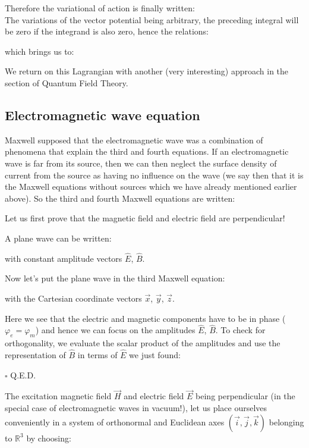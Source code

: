 	Therefore the variational of action is finally written:
	\\
	The variations of the vector potential being arbitrary, the preceding integral will be zero if the integrand is also zero, hence the relations:
	
	which brings us to:
	
	\begin{tcolorbox}[title=Remark,colframe=black,arc=10pt]
	We return on this Lagrangian with another (very interesting) approach in the section of Quantum Field Theory.
	\end{tcolorbox}
	
	\pagebreak
	\subsection{Electromagnetic wave equation}\label{electromagnetic wave equation}
	Maxwell supposed that the electromagnetic wave was a combination of phenomena that explain the third and fourth equations. If an electromagnetic wave is far from its source, then we can then neglect the surface density of current from the source as having no influence on the wave (we say then that it is the Maxwell equations without sources which we have already mentioned earlier above). So the third and fourth Maxwell equations are written:
	
	Let us first prove that the magnetic field and electric field are perpendicular!\label{perpendicularity electric magnetic field wave}
	\begin{dem}
	A plane wave can be written:
	
	with constant amplitude vectors $\hat{E}$, $\hat{B}$.

	Now let's put the plane wave in the third Maxwell equation:
	
	with the Cartesian coordinate vectors $\vec{x}$, $\vec{y}$, $\vec{z}$.
	
	Here we see that the electric and magnetic components have to be in phase ($\varphi_e=\varphi_m$) and hence we can focus on the amplitudes $\hat{E}$, $\hat{B}$. To check for orthogonality, we evaluate the scalar product of the amplitudes and use the representation of $\hat{B}$ in terms of $\hat{E}$ we just found:
	
	\begin{flushright}
		$\square$  Q.E.D.
	\end{flushright}
	\end{dem} 
	The excitation magnetic field $\vec{H}$ and electric field  $\vec{E}$ being perpendicular (in the special case of electromagnetic waves in vacuum!), let us place ourselves conveniently in a system of orthonormal and Euclidean axes $(\vec{i},\vec{j},\vec{k})$ belonging to $\mathbb{R}^3$ by choosing:
	
